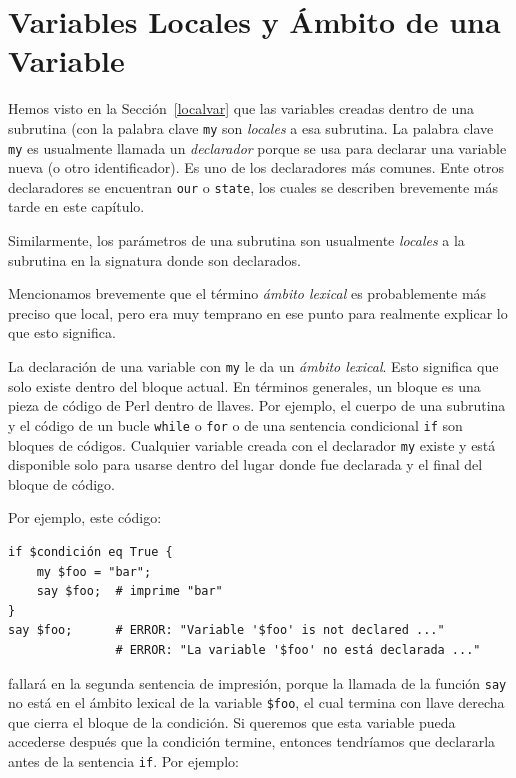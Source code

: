 \section{Variables Locales y Ámbito de una Variable}

Hemos visto en la Sección~\ref{localvar} que las variables
creadas dentro de una subrutina (con la palabra clave {\tt my}
son \emph{locales} a esa subrutina. La palabra clave {\tt my}
es usualmente llamada un \emph{declarador} porque 
se usa para declarar una variable nueva (o otro identificador).
Es uno de los declaradores más comunes. Ente otros declaradores
se encuentran {\tt our} o {\tt state}, los cuales se describen
brevemente más tarde en este capítulo.

Similarmente, los parámetros de una subrutina son usualmente
\emph{locales} a la subrutina en la signatura donde son
declarados.

Mencionamos brevemente que el término \emph{ámbito lexical}
es probablemente más preciso que local, pero era muy temprano
en ese punto para realmente explicar lo que esto significa.

La declaración de una variable con {\tt my} le da un \emph{ámbito lexical}.
Esto significa que solo existe dentro del bloque actual. En términos
generales, un bloque es una pieza de código de Perl dentro de llaves.
Por ejemplo, el cuerpo de una subrutina y el código de un bucle 
{\tt while} o {\tt for} o de una sentencia condicional {\tt if} 
son bloques de códigos. Cualquier variable creada con el declarador
{\tt my} existe y está disponible solo para usarse dentro del 
lugar donde fue declarada y el final del bloque de código.

Por ejemplo, este código:

\begin{verbatim}
if $condición eq True {
    my $foo = "bar";
    say $foo;  # imprime "bar"
}
say $foo;      # ERROR: "Variable '$foo' is not declared ..."
			   # ERROR: "La variable '$foo' no está declarada ..."
\end{verbatim}
%
fallará en la segunda sentencia de impresión, porque la llamada de la función
\verb|say| no está en el ámbito lexical de la variable {\tt \$foo}, 
el cual termina con llave derecha que cierra el bloque de la condición.
Si queremos que esta variable pueda accederse después que la condición termine,
entonces tendríamos que declararla antes de la sentencia {\tt if}.
Por ejemplo:

